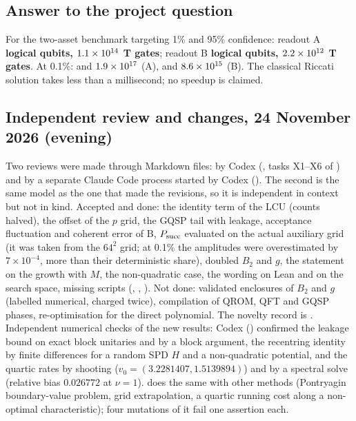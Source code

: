 \documentclass[11pt,a4paper]{article}
\begin{document}
\subsection*{Answer to the project question}

For the two-asset benchmark targeting 1\% and 95\% confidence: readout A
\textbf{\QAOne{} logical qubits, $1.1\times10^{14}$ T gates}; readout B
\textbf{\QBOne{} logical qubits, $2.2\times10^{12}$ T gates}. At 0.1\%:
\QATenth{} and $1.9\times10^{17}$ (A), \QBTenth{} and $8.6\times10^{15}$ (B). The classical
Riccati solution takes less than a millisecond; no speedup is claimed.

\subsection*{Independent review and changes, 24 November 2026 (evening)}

Two reviews were made through Markdown files: by Codex (, tasks X1--X6 of
) and by a separate Claude Code process started by Codex
(). The second is the same model as the one that made the revisions, so it is independent in
context but not in kind. Accepted and done: the identity term of the LCU (counts halved), the offset of the $p$ grid, the GQSP tail with
leakage, acceptance fluctuation and coherent error of B, $P_{\rm succ}$ evaluated on the actual auxiliary grid (it was taken from the
$64^2$ grid; at 0.1\% the amplitudes were overestimated by $7\times10^{-4}$, more than their deterministic share), doubled $B_2$ and $g$, the
statement on the growth with $M$, the non-quadratic case, the wording on Lean and on the search space, missing scripts
(, , ). Not done: validated enclosures of $B_2$ and $g$ (labelled
numerical, charged twice), compilation of QROM, QFT and GQSP phases, re-optimisation for the direct polynomial. The novelty record is
. Independent numerical checks of the new results: Codex () confirmed the leakage bound on
exact block unitaries and by a block argument, the recentring identity by finite differences for a random SPD $H$ and a non-quadratic
potential, and the quartic rates by shooting ($v_0=(3.2281407,1.5139894)$) and by a spectral solve (relative bias $0.026772$ at $\nu=1$).
 does the same with other methods (Pontryagin boundary-value problem, grid extrapolation, a
quartic running cost along a non-optimal characteristic); four mutations of it fail one assertion each.
\end{document}
